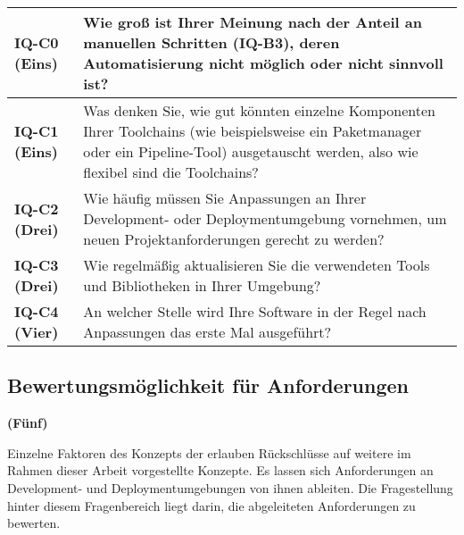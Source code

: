 \begin{table}[H]
    \centering
    \begin{tabular}{ >{\raggedright\bfseries}p{} p{} }
        IQ-C0 (Eins) &
        Wie groß ist Ihrer Meinung nach der Anteil an manuellen Schritten (IQ-B3), deren Automatisierung nicht möglich oder nicht sinnvoll ist?  \\
        \hline
        IQ-C1 (Eins) &
        Was denken Sie, wie gut könnten einzelne Komponenten Ihrer Toolchains (wie beispielsweise ein Paketmanager oder ein Pipeline-Tool) ausgetauscht werden, also wie flexibel sind die Toolchains?  \\
        \hline
        IQ-C2 (Drei) &
        Wie häufig müssen Sie Anpassungen an Ihrer Development- oder Deploymentumgebung vornehmen, um neuen Projektanforderungen gerecht zu werden?  \\
        \hline
        IQ-C3 (Drei) &
        Wie regelmäßig aktualisieren Sie die verwendeten Tools und Bibliotheken in Ihrer Umgebung?  \\
        \hline
        IQ-C4 (Vier) &
        An welcher Stelle wird Ihre Software in der Regel nach Anpassungen das erste Mal ausgeführt?  \\
    \end{tabular}
\end{table}

\clearpage

\subsection{Bewertungsmöglichkeit für Anforderungen}
\label{subsec:AA-01-04_evaluation-requirements}

\textbf{(Fünf)}

Einzelne Faktoren des Konzepts der  erlauben Rückschlüsse auf weitere im Rahmen dieser Arbeit vorgestellte Konzepte. Es lassen sich Anforderungen an Development- und Deploymentumgebungen von ihnen ableiten. Die Fragestellung hinter diesem Fragenbereich liegt darin, die abgeleiteten Anforderungen zu bewerten. 

